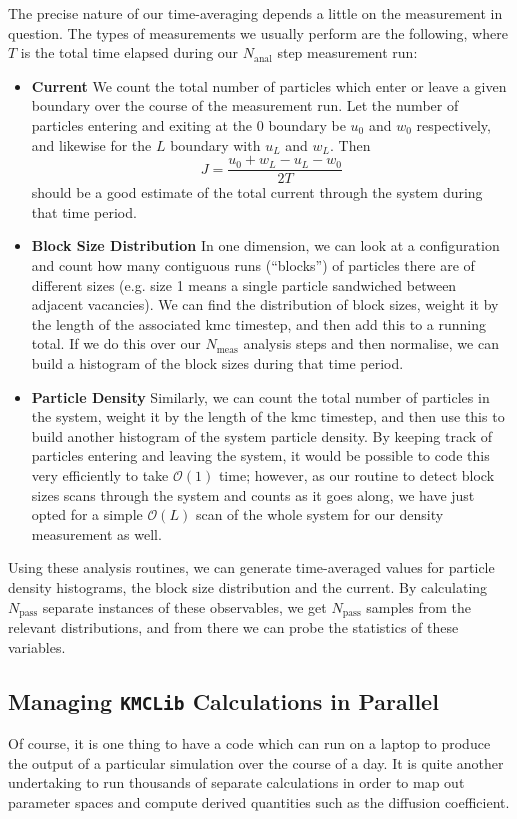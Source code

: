 The precise nature of our time-averaging depends a little on the measurement in question. The types
of measurements we usually perform are the following, where $T$ is the total time elapsed during
our $N_\mathrm{anal}$ step measurement run:
\begin{itemize}
 \item \textbf{Current} We count the total number of particles which enter or leave a given boundary
 over the course of the measurement run. Let the number of particles entering and 
 exiting at the $0$ boundary be $u_0$ and $w_0$ respectively, and likewise for the $L$ boundary with
 $u_L$ and $w_L$. Then
 \begin{equation}
  J = \frac{u_0+w_L-u_L-w_0}{2T}
 \end{equation}
should be a good estimate of the total current through the system during that time period.
\item \textbf{Block Size Distribution} In one dimension, we can look at a configuration and count how
many contiguous runs (``blocks'') of particles there are of different sizes (e.g. size 1 means a single
particle sandwiched between adjacent vacancies). We can find the distribution of block sizes, weight it
by the length of the associated kmc timestep, and then add this to a running total. If we do this over
our $N_\mathrm{meas}$ analysis steps and then normalise, we can build a histogram of the block sizes
during that time period.
\item \textbf{Particle Density} Similarly, we can count the total number of particles in the system,
weight it by the length of the kmc timestep, and then use this to build another histogram of the
system particle density. By keeping track of particles entering and leaving the system, it would be
possible to code this very efficiently to take $\mathcal{O}(1)$ time; however, as our routine to detect
block sizes scans through the system and counts as it goes along, we have just opted for a simple
$\mathcal{O}(L)$ scan of the whole system for our density measurement as well.
\end{itemize}
Using these analysis routines, we can generate time-averaged values for particle density histograms,
the block size distribution and the current. By calculating $N_\mathrm{pass}$ separate instances of 
these observables, we get $N_\mathrm{pass}$ samples from the relevant distributions, and from there
we can probe the statistics of these variables.


\subsection{Managing \texttt{KMCLib} Calculations in Parallel} 
Of course, it is one thing to have a code which can run on a laptop to produce the output of a 
particular simulation over the course of a day. It is quite another undertaking to run thousands of
separate calculations in order to map out parameter spaces and compute derived quantities such as the
diffusion coefficient. 

